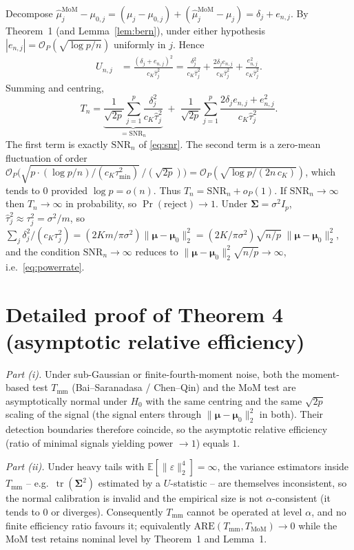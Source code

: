 \documentclass[11pt]{article}
\newcommand{\bmu}{\boldsymbol{\mu}}
\newcommand{\bSig}{\boldsymbol{\Sigma}}
\newcommand{\E}{\mathbb{E}}
\newcommand{\normt}[1]{\lVert #1 \rVert_2}
\newcommand{\tr}{\operatorname{tr}}
\theoremstyle{plain}
\theoremstyle{definition}
\begin{document}
Decompose
$\hat\mu^{\mathrm{MoM}}_j-\mu_{0,j}
 = (\mu_j-\mu_{0,j}) + (\hat\mu^{\mathrm{MoM}}_j-\mu_j)
 = \delta_j + e_{n,j}$.
By Theorem~1 (and Lemma~\ref{lem:bern}), under either hypothesis
$|e_{n,j}|=\mathcal{O}_P(\sqrt{\log p/n})$ uniformly in $j$. Hence
\begin{align*}
U_{n,j}
 &= \frac{(\delta_j+e_{n,j})^2}{c_K\hat\tau_j^2}
  = \frac{\delta_j^2}{c_K\hat\tau_j^2}
  + \frac{2\delta_j e_{n,j}}{c_K\hat\tau_j^2}
  + \frac{e_{n,j}^2}{c_K\hat\tau_j^2}.
\end{align*}
Summing and centring,
\[
T_n = \underbrace{\frac{1}{\sqrt{2p}}
      \sum_{j=1}^p \frac{\delta_j^2}{c_K\hat\tau_j^2}}_{\displaystyle =\mathrm{SNR}_n}
      \;+\; \frac{1}{\sqrt{2p}}\sum_{j=1}^p
           \frac{2\delta_j e_{n,j}+e_{n,j}^2}{c_K\hat\tau_j^2}.
\]
The first term is exactly $\mathrm{SNR}_n$ of \eqref{eq:snr}. The second term is
a zero-mean fluctuation of order
$\mathcal{O}_P\!\bigl(\sqrt{p\cdot (\log p/n)/(c_K\tau_{\min}^2)}\,/(\sqrt{2p})\bigr)
 =\mathcal{O}_P(\sqrt{\log p/(2n\,c_K)})$, which tends to $0$ provided
$\log p=o(n)$. Thus $T_n=\mathrm{SNR}_n+o_P(1)$. If $\mathrm{SNR}_n\to\infty$
then $T_n\to\infty$ in probability, so $\Pr(\text{reject})\to 1$. Under
$\bSig=\sigma^2 I_p$, $\hat\tau_j^2\approx \tau_j^2=\sigma^2/m$, so
$\sum_j\delta_j^2/(c_K\tau_j^2)
 =(2Km/\pi\sigma^2)\normt{\bmu-\bmu_0}^2
 =(2K/\pi\sigma^2)\sqrt{n/p}\;\normt{\bmu-\bmu_0}^2$,
and the condition $\mathrm{SNR}_n\to\infty$ reduces to
$\normt{\bmu-\bmu_0}^2\sqrt{n/p}\to\infty$, i.e.\ \eqref{eq:powerrate}.

\section{Detailed proof of Theorem 4 (asymptotic relative efficiency)}
\label{sec:proofT4}

\emph{Part (i).} Under sub-Gaussian or finite-fourth-moment noise, both the
moment-based test $T_{\mathrm{mm}}$ (Bai--Saranadasa / Chen--Qin) and the MoM
test are asymptotically normal under $H_0$ with the same centring and the same
$\sqrt{2p}$ scaling of the signal (the signal enters through
$\normt{\bmu-\bmu_0}^2$ in both). Their detection boundaries therefore coincide,
so the asymptotic relative efficiency (ratio of minimal signals yielding power
$\to 1$) equals $1$.

\emph{Part (ii).} Under heavy tails with $\E[\normt{\varepsilon}^4]=\infty$, the
variance estimators inside $T_{\mathrm{mm}}$ -- e.g.\ $\tr(\bSig^2)$ estimated by
a $U$-statistic -- are themselves inconsistent, so the normal calibration is
invalid and the empirical size is not $\alpha$-consistent (it tends to $0$ or
diverges). Consequently $T_{\mathrm{mm}}$ cannot be operated at level $\alpha$,
and no finite efficiency ratio favours it; equivalently
$\mathrm{ARE}(T_{\mathrm{mm}},T_{\mathrm{MoM}})\to 0$ while the MoM test retains
nominal level by Theorem~1 and Lemma~1.
\end{document}
